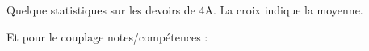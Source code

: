 

Quelque statistiques sur les devoirs de 4A. La croix indique la moyenne.

\begin{center}
   
\end{center}

Et pour le couplage notes/compétences :
\begin{center}

\end{center}

